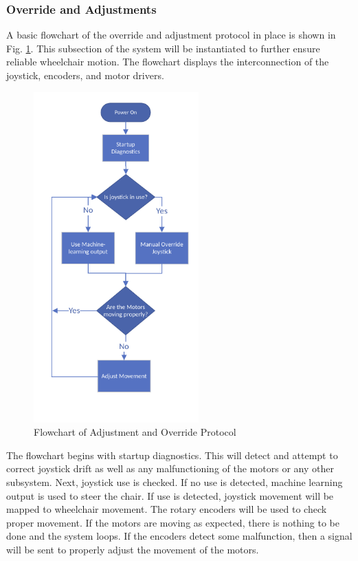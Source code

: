 \documentclass[conference]{IEEEtran}
\begin{document}
        \subsubsection{Override and Adjustments}   
        A basic flowchart of the override and adjustment protocol in place is shown in Fig. \ref{fig:override}. This subsection of the system will be instantiated to further ensure reliable wheelchair motion. The flowchart displays the interconnection of the joystick, encoders, and motor drivers. 
         \begin{figure}[htbp]
            \centering
            \includegraphics[height=5in, keepaspectratio]{figs/D/override.png}
            \caption{Flowchart of Adjustment and Override Protocol}
            \label{fig:override}
        \end{figure}
        
        The flowchart begins with startup diagnostics. This will detect and attempt to correct joystick drift as well as any malfunctioning of the motors or any other subsystem. Next, joystick use is checked. If no use is detected, machine learning output is used to steer the chair. If use is detected, joystick movement will be mapped to wheelchair movement. The rotary encoders will be used to check proper movement. If the motors are moving as expected, there is nothing to be done and the system loops. If the encoders detect some malfunction, then a signal will be sent to properly adjust the movement of the motors. 
\end{document}
